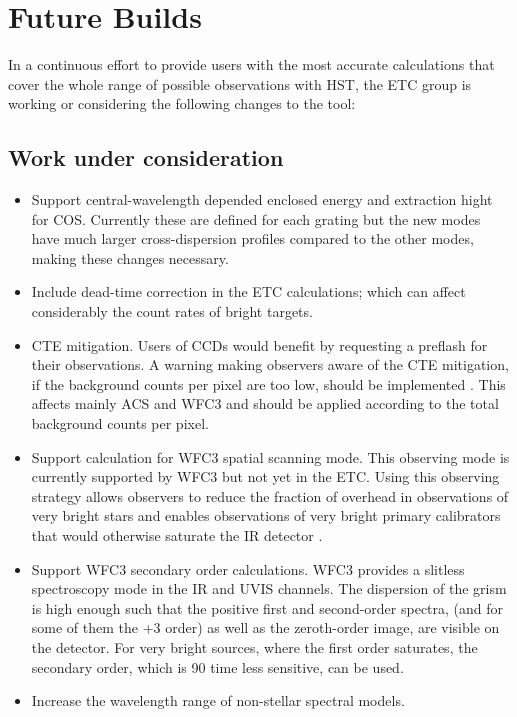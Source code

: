 \documentclass[11pt,twoside]{article}
\begin{document}
\section{Future Builds}

In a continuous effort to provide users with the most accurate calculations that cover
the whole range of possible observations with HST, the ETC group is working or considering
the following changes to the tool:

\subsection{Work under consideration}

\begin{itemize}

\item Support central-wavelength depended enclosed energy and extraction hight
for COS. Currently these are  defined for each  grating but the new modes have  
much larger cross-dispersion profiles compared to the other modes, making 
these changes necessary.

\item Include dead-time correction in the ETC calculations; which can
affect considerably the count rates of bright targets.

\item CTE mitigation.  Users of CCDs would benefit by requesting a preflash for their observations. 
A warning making observers aware of the CTE mitigation, if the background counts per pixel are too low,
should be implemented . This
affects mainly ACS and WFC3 and should be applied according to the total background 
counts per pixel.

\item Support calculation for WFC3 spatial scanning mode. This observing mode is currently
supported by WFC3 but not yet in the ETC. Using this observing strategy allows observers to
reduce the fraction of overhead in observations of very bright stars and enables observations 
of very bright primary calibrators that would otherwise saturate the IR detector \citep{TheMcs2011}. 

\item Support WFC3 secondary order calculations. WFC3 provides a slitless spectroscopy mode 
in the IR and UVIS channels. The dispersion of the grism is high enough such that the positive 
first and second-order spectra, (and for some of them the +3 order) as well as the zeroth-order 
image, are visible on the detector. For very bright sources, where the first order saturates, 
the secondary order, which is 90 time less sensitive, can be used.

\item Increase the wavelength range of non-stellar spectral models.

\end{itemize}
\end{document}
